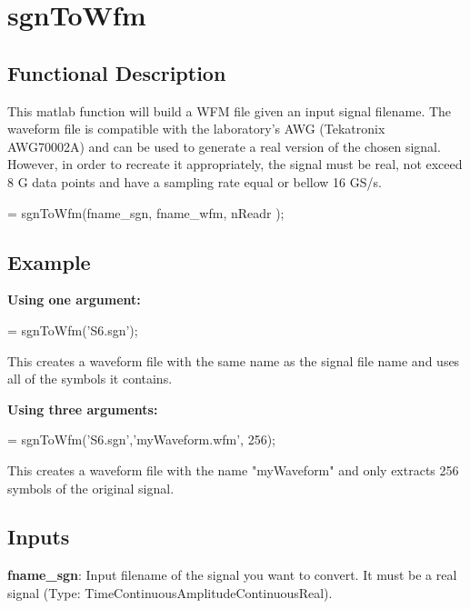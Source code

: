 \clearpage

\section{sgnToWfm}

\subsection*{Functional Description}

This matlab function will build a WFM file given an input signal filename. The waveform file is compatible with the laboratory's AWG (Tekatronix AWG70002A) and can be used to generate a real version of the chosen signal. However, in order to recreate it appropriately, the signal must be real, not exceed 8 G data points and have a sampling rate equal or bellow 16 GS/s. 


\bigskip
{} = sgnToWfm(fname\_sgn, fname\_wfm, nReadr );

\subsection*{Example}
\textbf{Using one argument:}

\bigskip

 = sgnToWfm('S6.sgn');
\bigskip

\noindent
This creates a waveform file with the same name as the signal file name and uses all of the symbols it contains.
\bigskip

\noindent
\textbf{Using three arguments:} 

\bigskip

 = sgnToWfm('S6.sgn','myWaveform.wfm', 256);
\bigskip

\noindent
This creates a waveform file with the name "myWaveform" and only extracts 256 symbols of the original signal.

\subsection*{Inputs}

\indent

\textbf{fname\_sgn}: Input filename of the signal you want to convert. It must be a real signal (Type: TimeContinuousAmplitudeContinuousReal). 
\bigskip

